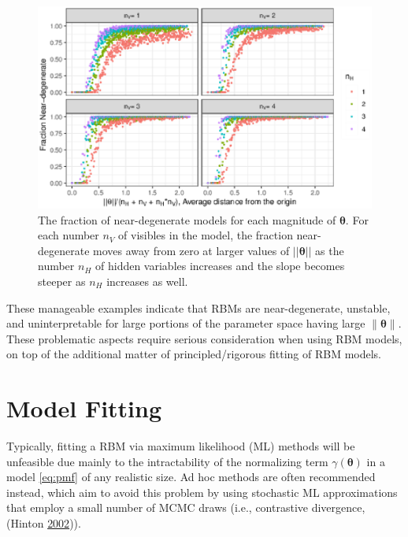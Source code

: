\documentclass[]{article}
\theoremstyle{definition}
\newcommand{\nv}{{n_{\scriptscriptstyle V}}}
\newcommand{\nh}{{n_{\scriptscriptstyle H}}}
\begin{document}
\par
\begin{figure}
\includegraphics{paper_files/figure-latex/split-plots-dist-1} \caption{The fraction of near-degenerate models for each magnitude of $\boldsymbol \theta$. For each number $\nv$ of visibles in the model, the fraction near-degenerate moves away from zero at larger values of $||\boldsymbol \theta||$ as the number $\nh$ of hidden variables increases and the slope becomes steeper as $\nh$ increases as well.}\label{fig:split-plots-dist}
\end{figure}
These manageable examples indicate that RBMs are near-degenerate,
unstable, and uninterpretable for large portions of the parameter space
having large \(\|\boldsymbol \theta\|\). These problematic aspects
require serious consideration when using RBM models, on top of the
additional matter of principled/rigorous fitting of RBM models.

\hypertarget{model-fitting}{%
\section{Model Fitting}\label{model-fitting}}

Typically, fitting a RBM via maximum likelihood (ML) methods will be
unfeasible due mainly to the intractability of the normalizing term
\(\gamma(\boldsymbol \theta)\) in a model \eqref{eq:pmf} of any realistic
size. Ad hoc methods are often recommended instead, which aim to avoid
this problem by using stochastic ML approximations that employ a small
number of MCMC draws (i.e., contrastive divergence, (Hinton
\protect\hyperlink{ref-hinton2002training}{2002})).
\end{document}
